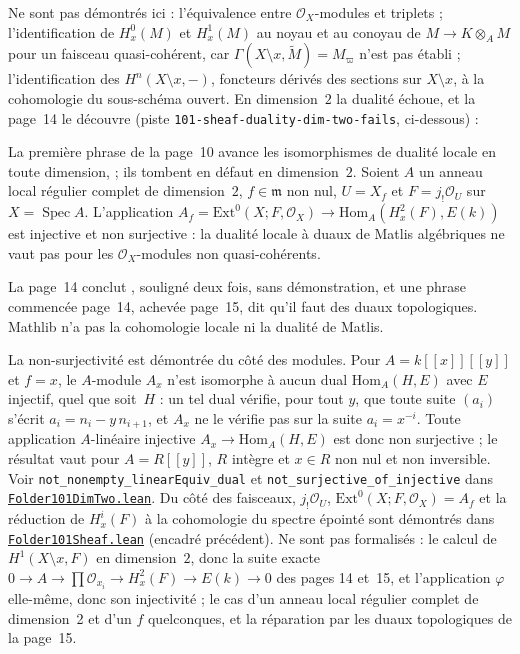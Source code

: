 Ne sont pas démontrés ici : l'équivalence entre $\mathcal O_X$-modules et triplets ; l'identification de $H^0_x(M)$ et $H^1_x(M)$ au noyau et au conoyau de $M \to K \otimes_A M$ pour un faisceau quasi-cohérent, car $\Gamma(X \setminus x, \tilde M) = M_\varpi$ n'est pas établi ; l'identification des $H^n(X \setminus x, -)$, foncteurs dérivés des sections sur $X \setminus x$, à la cohomologie du sous-schéma ouvert. En dimension~$2$ la dualité échoue, et la page~14 le découvre (piste \texttt{101-sheaf-duality-dim-two-fails}, ci-dessous) :

\begin{encadre}
\begin{contrexemple*}\nonverifie
La première phrase de la page~10 avance les isomorphismes de dualité locale en toute dimension,  ; ils tombent en défaut en dimension~$2$. Soient $A$ un anneau local régulier complet de dimension~$2$, $f \in \mathfrak m$ non nul, $U = X_f$ et $F = j_!\mathcal O_U$ sur $X = \operatorname{Spec} A$. L'application $A_f = \mathrm{Ext}^0(X; F, \mathcal O_X) \to \mathrm{Hom}_A(H^2_x(F), E(k))$ est injective et non surjective : la dualité locale à duaux de Matlis algébriques ne vaut pas pour les $\mathcal O_X$-modules non quasi-cohérents.
\end{contrexemple*}
\end{encadre}
{\small La page~14 conclut , souligné deux fois, sans démonstration, et une phrase commencée page~14, achevée page~15, dit qu'il faut des duaux topologiques. Mathlib n'a pas la cohomologie locale ni la dualité de Matlis.\par}
{\small La non-surjectivité est démontrée du côté des modules. Pour $A = k[[x]][[y]]$ et $f = x$, le $A$-module $A_x$ n'est isomorphe à aucun dual $\mathrm{Hom}_A(H, E)$ avec $E$ injectif, quel que soit~$H$ : un tel dual vérifie, pour tout $y$, que toute suite $(a_i)$ s'écrit $a_i = n_i - y\,n_{i+1}$, et $A_x$ ne le vérifie pas sur la suite $a_i = x^{-i}$. Toute application $A$-linéaire injective $A_x \to \mathrm{Hom}_A(H, E)$ est donc non surjective ; le résultat vaut pour $A = R[[y]]$, $R$ intègre et $x \in R$ non nul et non inversible. Voir \texttt{not\_nonempty\_linearEquiv\_dual} et \texttt{not\_surjective\_of\_injective} dans \href{\leanblobmain/AlgebraicGeometry/Folder101DimTwo.lean}{\texttt{Folder101DimTwo.\allowbreak{}lean}}. Du côté des faisceaux, $j_!\mathcal O_U$, $\mathrm{Ext}^0(X; F, \mathcal O_X) = A_f$ et la réduction de $H^{i}_x(F)$ à la cohomologie du spectre épointé sont démontrés dans \href{\leanblobmain/AlgebraicGeometry/Folder101Sheaf.lean}{\texttt{Folder101Sheaf.\allowbreak{}lean}} (encadré précédent). Ne sont pas formalisés : le calcul de $H^1(X \setminus x, F)$ en dimension~$2$, donc la suite exacte $0 \to A \to \prod \mathcal O_{x_i} \to H^2_x(F) \to E(k) \to 0$ des pages 14 et~15, et l'application $\varphi$ elle-même, donc son injectivité ; le cas d'un anneau local régulier complet de dimension~2 et d'un $f$ quelconques, et la réparation par les duaux topologiques de la page~15.\par}
